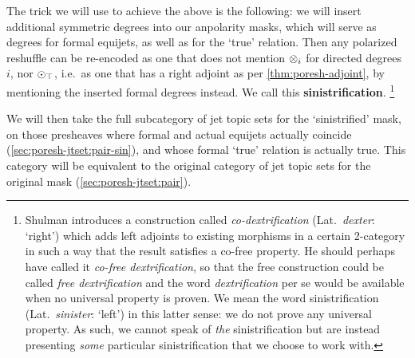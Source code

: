 \documentclass[a4paper]{memoir}
\begin{document}
{The trick we will use to achieve the above is the following: we will insert additional symmetric degrees into our anpolarity masks, which will serve as degrees for formal equijets, as well as for the `true' relation.
Then any polarized reshuffle can be re-encoded as one that does not mention ${\otimes}_i$ for directed degrees $i$, nor ${\odot}_\top$, i.e.\ as one that has a right adjoint as per \cref{thm:poresh-adjoint}, by mentioning the inserted formal degrees instead.
We call this \textbf{sinistrification}.%
\footnote{Shulman \cite{matt} introduces a construction called \emph{co-dextrification} (Lat.\ \emph{dexter}: `right') which adds left adjoints to existing morphisms in a certain 2-category in such a way that the result satisfies a co-free property. He should perhaps have called it \emph{co-free dextrification}, so that the free construction could be called \emph{free dextrification} and the word \emph{dextrification} per se would be available when no universal property is proven. We mean the word sinistrification (Lat.\ \emph{sinister}: `left') in this latter sense: we do not prove any universal property. As such, we cannot speak of \emph{the} sinistrification but are instead presenting \emph{some} particular sinistrification that we choose to work with.}

We will then take the full subcategory of jet topic sets for the `sinistrified' mask, on those presheaves where formal and actual equijets actually coincide (\cref{sec:poresh-jtset:pair-sin}), and whose formal `true' relation is actually true.
This category will be equivalent to the original category of jet topic sets for the original mask (\cref{sec:poresh-jtset:pair}).


\bigskip

}
\end{document}
